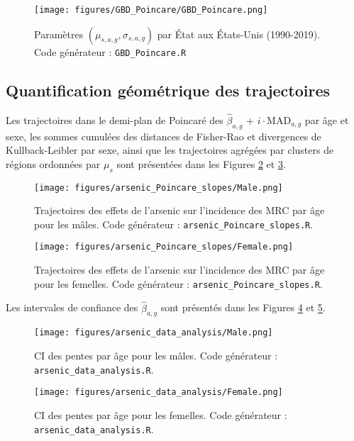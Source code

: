 \begin{figure}[H]
	\centering
	\texttt{[image: figures/GBD\_Poincare/GBD\_Poincare.png]}
	\caption{Paramètres $(\mu_{s,a,g}, \sigma_{s,a,g})$ par État aux États-Unis (1990-2019). Code générateur : \texttt{GBD\_Poincare.R}}
	\label{fig:GBD_Poincare}
\end{figure}

\subsection{Quantification géométrique des trajectoires}

Les trajectoires dans le demi-plan de Poincaré des $\hat{\beta}_{a,g}$ + $i \cdot \mathrm{MAD}_{a,g}$ par âge et sexe, les sommes cumulées des distances de Fisher-Rao et divergences de Kullback-Leibler par sexe, ainsi que les trajectoires agrégées par clusters de régions ordonnées par $\mu_s$ sont présentées dans les Figures \ref{fig:trajectoires-arsenic-males} et \ref{fig:trajectoires-arsenic-females}.

\begin{figure}[H]
\centering
\texttt{[image: figures/arsenic\_Poincare\_slopes/Male.png]}
\caption{Trajectoires des effets de l'arsenic sur l'incidence des MRC par âge pour les mâles. Code générateur : \texttt{arsenic\_Poincare\_slopes.R}.}
\label{fig:trajectoires-arsenic-males}
\end{figure}

\begin{figure}[H]
	\centering
	\texttt{[image: figures/arsenic\_Poincare\_slopes/Female.png]}
	\caption{Trajectoires des effets de l'arsenic sur l'incidence des MRC par âge pour les femelles. Code générateur : \texttt{arsenic\_Poincare\_slopes.R}.}
	\label{fig:trajectoires-arsenic-females}
\end{figure}

Les intervales de confiance des $\hat{\beta}_{a,g}$ sont présentés dans les Figures \ref{fig:CI-arsenic-males} et \ref{fig:CI-arsenic-females}.

\begin{figure}[H]
	\centering
	\texttt{[image: figures/arsenic\_data\_analysis/Male.png]}
	\caption{CI des pentes par âge pour les mâles. Code générateur : \texttt{arsenic\_data\_analysis.R}.}
	\label{fig:CI-arsenic-males}
\end{figure}

\begin{figure}[H]
	\centering
	\texttt{[image: figures/arsenic\_data\_analysis/Female.png]}
	\caption{CI des pentes par âge pour les femelles. Code générateur : \texttt{arsenic\_data\_analysis.R}.}
	\label{fig:CI-arsenic-females}
\end{figure}

